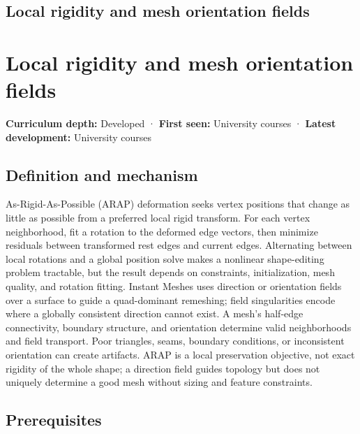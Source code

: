 \hypertarget{appendix-7107009c505b}{}
\section*{Local rigidity and mesh orientation fields}
\chapter{Local rigidity and mesh orientation fields}\label{appendix-7107009c505b-local-rigidity-and-mesh-orientation-fields}

\textbf{Curriculum depth:} Developed · \textbf{First seen:} University courses · \textbf{Latest development:} University courses

\section{Definition and mechanism}\label{appendix-7107009c505b-definition-and-mechanism}

As-Rigid-As-Possible (ARAP) deformation seeks vertex positions that change as little as possible from a preferred local rigid transform. For each vertex neighborhood, fit a rotation to the deformed edge vectors, then minimize residuals between transformed rest edges and current edges. Alternating between local rotations and a global position solve makes a nonlinear shape-editing problem tractable, but the result depends on constraints, initialization, mesh quality, and rotation fitting. Instant Meshes uses direction or orientation fields over a surface to guide a quad-dominant remeshing; field singularities encode where a globally consistent direction cannot exist. A mesh's half-edge connectivity, boundary structure, and orientation determine valid neighborhoods and field transport. Poor triangles, seams, boundary conditions, or inconsistent orientation can create artifacts. ARAP is a local preservation objective, not exact rigidity of the whole shape; a direction field guides topology but does not uniquely determine a good mesh without sizing and feature constraints.

\section{Prerequisites}\label{appendix-7107009c505b-prerequisites}

